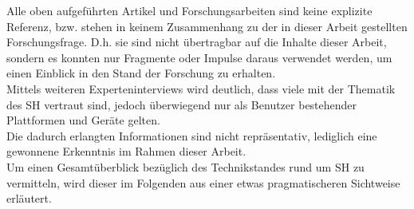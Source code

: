     Alle oben aufgeführten Artikel und Forschungsarbeiten sind keine explizite Referenz, bzw. stehen in keinem  
    Zusammenhang zu der in dieser Arbeit gestellten Forschungsfrage. D.h. sie sind nicht übertragbar auf die Inhalte dieser Arbeit, sondern 
    es konnten nur Fragmente oder Impulse daraus verwendet werden, um einen Einblick in den Stand der Forschung zu erhalten. 
    \\ 
    Mittels weiteren Experteninterviews wird deutlich, dass viele mit der 
    Thematik des \acl{SH} vertraut sind, jedoch überwiegend nur als Benutzer bestehender Plattformen und Geräte gelten.
    \\
    Die dadurch erlangten Informationen sind nicht repräsentativ, lediglich eine gewonnene Erkenntnis im Rahmen 
    dieser Arbeit.
    \\
    Um einen Gesamtüberblick bezüglich des Technikstandes rund um \acl{SH} zu vermitteln, 
    wird dieser im Folgenden aus einer etwas pragmatischeren Sichtweise erläutert.
    
